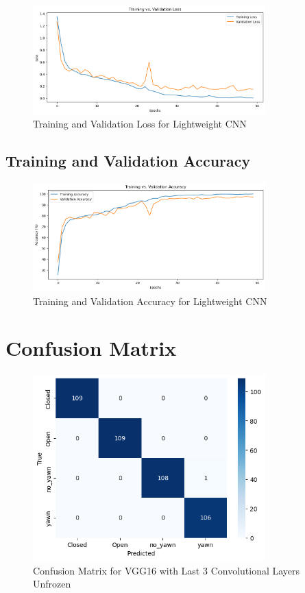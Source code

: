 \begin{figure}[htbp]
\centering
\includegraphics[width=0.8\textwidth]{train_valid_err_cnn.png}
\caption{Training and Validation Loss for Lightweight CNN}
\end{figure}

\subsection{Training and Validation Accuracy}

\begin{figure}[htbp]
\centering
\includegraphics[width=0.8\textwidth]{train_valid_acc_cnn.png}
\caption{Training and Validation Accuracy for Lightweight CNN}
\end{figure}

\newpage %

\section{Confusion Matrix}

\begin{figure}[htbp]
\centering
\includegraphics[width=0.8\textwidth]{vgg_16_unfreeze.png}
\caption{Confusion Matrix for VGG16 with Last 3 Convolutional Layers Unfrozen}
\end{figure}

